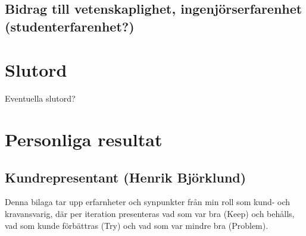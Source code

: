 \documentclass[conference,a4paper]{IEEEtran}
\begin{document}
\subsection{Bidrag till vetenskaplighet, ingenjörserfarenhet (studenterfarenhet?)}

\section{Slutord} \label{sec:slutord}
Eventuella slutord?


%
%
%







\appendices
\section{Personliga resultat}

\subsection{Kundrepresentant (Henrik Björklund)}
Denna bilaga tar upp erfarnheter och synpunkter från min roll som kund- och kravansvarig, där per iteration presenteras vad som var bra (Keep) och behålls, vad som kunde förbättras (Try) och vad som var mindre bra (Problem).
\end{document}
